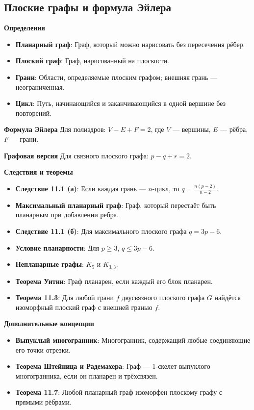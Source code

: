 \subsection{Плоские графы и формула Эйлера}

\textbf{Определения}
\begin{itemize}
    \item \textbf{Планарный граф}: Граф, который можно нарисовать без пересечения рёбер.
    \item \textbf{Плоский граф}: Граф, нарисованный на плоскости.
    \item \textbf{Грани}: Области, определяемые плоским графом; внешняя грань — неограниченная.
    \item \textbf{Цикл}: Путь, начинающийся и заканчивающийся в одной вершине без повторений.
\end{itemize}

\textbf{Формула Эйлера}
Для полиэдров: \( V - E + F = 2 \), где \( V \) — вершины, \( E \) — рёбра, \( F \) — грани.

\textbf{Графовая версия}
Для связного плоского графа: \( p - q + r = 2 \).

\textbf{Следствия и теоремы}
\begin{itemize}
    \item \textbf{Следствие 11.1 (а)}: Если каждая грань — \( n \)-цикл, то \( q = \frac{n(p-2)}{n-2} \).
    \item \textbf{Максимальный планарный граф}: Граф, который перестаёт быть планарным при добавлении ребра.
    \item \textbf{Следствие 11.1 (б)}: Для максимального плоского графа \( q = 3p - 6 \).
    \item \textbf{Условие планарности}: Для \( p \geq 3 \), \( q \leq 3p - 6 \).
    \item \textbf{Непланарные графы}: \( K_5 \) и \( K_{3,3} \).
    \item \textbf{Теорема Уитни}: Граф планарен, если каждый его блок планарен.
    \item \textbf{Теорема 11.3}: Для любой грани \( f \) двусвязного плоского графа \( G \) найдётся изоморфный плоский граф с внешней гранью \( f \).
\end{itemize}

\textbf{Дополнительные концепции}
\begin{itemize}
    \item \textbf{Выпуклый многогранник}: Многогранник, содержащий любые соединяющие его точки отрезки.
    \item \textbf{Теорема Штейница и Радемахера}: Граф — 1-скелет выпуклого многогранника, если он планарен и трёхсвязен.
    \item \textbf{Теорема 11.7}: Любой планарный граф изоморфен плоскому графу с прямыми рёбрами.
\end{itemize}